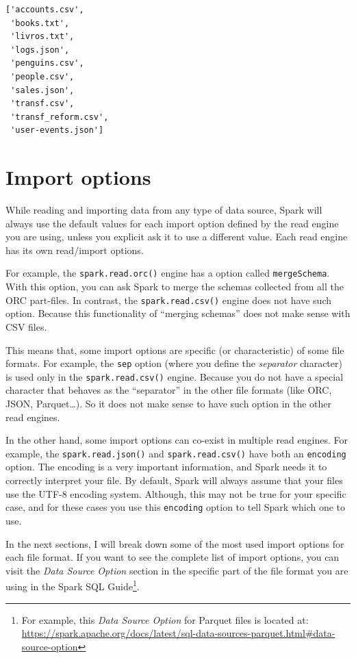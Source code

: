 \documentclass[
  11pt,
  letterpaper,
  DIV=11,
  numbers=noendperiod]{scrreprt}
\begin{document}
\begin{verbatim}
['accounts.csv',
 'books.txt',
 'livros.txt',
 'logs.json',
 'penguins.csv',
 'people.csv',
 'sales.json',
 'transf.csv',
 'transf_reform.csv',
 'user-events.json']
\end{verbatim}

\section{Import options}\label{import-options}

While reading and importing data from any type of data source, Spark
will always use the default values for each import option defined by the
read engine you are using, unless you explicit ask it to use a different
value. Each read engine has its own read/import options.

For example, the \texttt{spark.read.orc()} engine has a option called
\texttt{mergeSchema}. With this option, you can ask Spark to merge the
schemas collected from all the ORC part-files. In contrast, the
\texttt{spark.read.csv()} engine does not have such option. Because this
functionality of ``merging schemas'' does not make sense with CSV files.

This means that, some import options are specific (or characteristic) of
some file formats. For example, the \texttt{sep} option (where you
define the \emph{separator} character) is used only in the
\texttt{spark.read.csv()} engine. Because you do not have a special
character that behaves as the ``separator'' in the other file formats
(like ORC, JSON, Parquet\ldots). So it does not make sense to have such
option in the other read engines.

In the other hand, some import options can co-exist in multiple read
engines. For example, the \texttt{spark.read.json()} and
\texttt{spark.read.csv()} have both an \texttt{encoding} option. The
encoding is a very important information, and Spark needs it to
correctly interpret your file. By default, Spark will always assume that
your files use the UTF-8 encoding system. Although, this may not be true
for your specific case, and for these cases you use this
\texttt{encoding} option to tell Spark which one to use.

In the next sections, I will break down some of the most used import
options for each file format. If you want to see the complete list of
import options, you can visit the \emph{Data Source Option} section in
the specific part of the file format you are using in the Spark SQL
Guide\footnote{For example, this \emph{Data Source Option} for Parquet
  files is located at:
  \url{https://spark.apache.org/docs/latest/sql-data-sources-parquet.html\#data-source-option}}.
\end{document}
